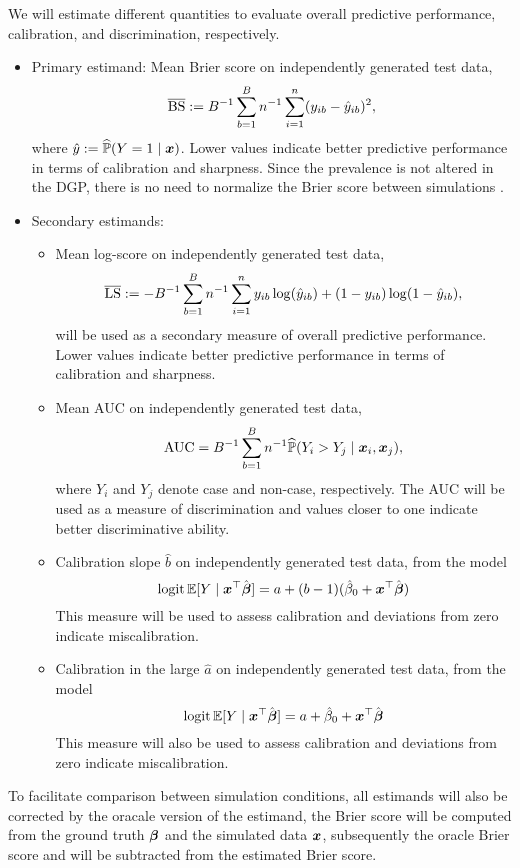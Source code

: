 \documentclass[a4paper, 11pt]{article}\usepackage[]{graphicx}\usepackage[]{color}
\begin{document}
We will estimate different quantities to evaluate overall predictive performance,
calibration, and discrimination, respectively.
\begin{itemize}
  \item Primary estimand: Mean Brier score on independently generated test data,
  $$\operatorname{\overline{BS}} := B^{-1} \sum_{b=1}^B n^{-1} \sum_{i=1}^n (y_{ib} - \hat{y}_{ib})^2,$$
  where $\hat{y} := \widehat{\mathbb{P}}(Y = 1 \mid \text{\boldmath$x$})$. Lower values
  indicate better predictive performance in terms of calibration and
  sharpness. Since the prevalence is not altered in the DGP,
  there is no need to normalize the Brier score between simulations
  \citep{steyerberg2019clinical}.
  \item Secondary estimands:
  \begin{itemize}
    \item Mean log-score on independently generated test data,
    $$\operatorname{\overline{LS}} := - B^{-1} \sum_{b=1}^B n^{-1} \sum_{i=1}^n y_{ib} \log(\hat{y}_{ib})
    + (1 - y_{ib}) \log (1 - \hat{y}_{ib}),$$
    will be used as a secondary measure of overall predictive performance. Lower
    values indicate better predictive performance in terms of calibration and
    sharpness.
    \item Mean AUC on independently generated test data,
    $$\text{AUC} = B^{-1} \sum_{b=1}^B n^{-1} \widehat{\mathbb{P}}(Y_i > Y_j \mid \text{\boldmath$x$}_i, \text{\boldmath$x$}_j),$$
    where $Y_i$ and $Y_j$ denote case and non-case, respectively. The AUC
    will be used as a measure of discrimination and values closer to one
    indicate better discriminative ability. 
    \item Calibration slope $\hat b$ on independently generated test data, from
          the model
    $$\operatorname{logit}\mathbb{E}[Y \mid \text{\boldmath$x$}^\top\hat{\text{\boldmath$\beta$}}] = a + (b - 1) (\hat\beta_0 + \text{\boldmath$x$}^\top\hat{\text{\boldmath$\beta$}})$$
    This measure will be used to assess calibration and deviations from
    zero indicate miscalibration.
    \item Calibration in the large $\hat a$ on independently generated test
          data, from the model
    $$\operatorname{logit}\mathbb{E}[Y \mid \text{\boldmath$x$}^\top\hat{\text{\boldmath$\beta$}}] = a + \hat\beta_0 + \text{\boldmath$x$}^\top\hat{\text{\boldmath$\beta$}}$$
    This measure will also be used to assess calibration and deviations from
    zero indicate miscalibration.
  \end{itemize}
\end{itemize}

To facilitate comparison between simulation conditions, all estimands will also
be corrected by the oracale version of the estimand, \eg the Brier score will be
computed from the ground truth $\text{\boldmath$\beta$}$ and the simulated data $\text{\boldmath$x$}$,
subsequently the oracle Brier score and will be subtracted from the estimated
Brier score.
\end{document}
